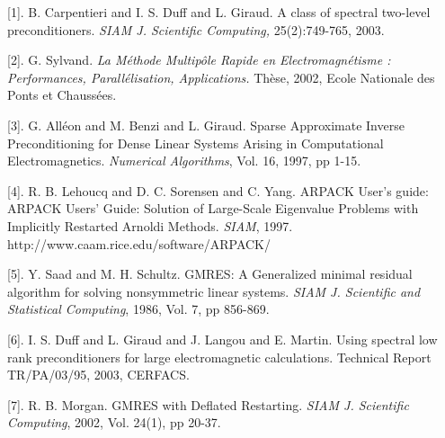 \documentclass{report}
\begin{document}
\begin{description}
\item{[1].}
B. Carpentieri and I. S. Duff and L. Giraud. A class of spectral
two-level preconditioners.
{\it SIAM J. Scientific Computing,} 25(2):749-765, 2003.
\item{[2].}
G. Sylvand. {\it La M\'ethode Multip\^ole Rapide en Electromagn\'etisme :
Performances, Parall\'elisation, Applications.}
Th\`{e}se, 2002, Ecole {N}ationale des {P}onts et {C}hauss\'ees.
\item{[3].}
G. All{\'e}on and M. Benzi and L. Giraud. Sparse Approximate Inverse
Preconditioning for Dense Linear Systems Arising in Computational
Electromagnetics.
\textit{Numerical Algorithms}, Vol. 16, 1997, pp 1-15.
\item{[4].}
R. B. Lehoucq and D. C. Sorensen and C. Yang. ARPACK User's guide: ARPACK
Users' Guide: Solution of Large-Scale Eigenvalue Problems with Implicitly
Restarted Arnoldi Methods.
\textit{SIAM}, 1997.\\
http://www.caam.rice.edu/software/ARPACK/
\item{[5].}
Y. Saad and M. H. Schultz. GMRES: A Generalized minimal residual
algorithm for solving nonsymmetric linear systems.
\textit{SIAM J. Scientific and Statistical Computing}, 1986, Vol. 7, pp 856-869.
\item{[6].}
I. S. Duff and L. Giraud and J. Langou and E. Martin. Using spectral low
rank preconditioners for large electromagnetic calculations.
Technical Report TR/PA/03/95, 2003, CERFACS.
\item{[7].}
R. B. Morgan. GMRES with Deflated Restarting.
\textit{SIAM J. Scientific Computing}, 2002, Vol. 24(1), pp 20-37.
\end{description}
\end{document}
